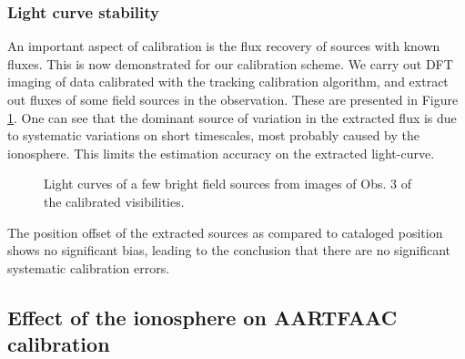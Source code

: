 \documentclass{aa}
\begin{document}
\subsubsection{Light curve stability}

An important  aspect of calibration is  the flux recovery of  sources with known
fluxes. This is  now demonstrated for our calibration scheme.   We carry out DFT
imaging of data calibrated with  the tracking calibration algorithm, and extract
out fluxes  of some field  sources in the  observation.  These are  presented in
Figure  \ref{fig:Light-curves-of}.  One  can  see that  the  dominant source  of
variation in  the extracted flux  is due to  systematic variations on   short
timescales, most probably  caused by the ionosphere.   This limits the estimation
accuracy on the extracted light-curve.

\begin{figure}[tbh]

\caption{\label{fig:Light-curves-of}Light curves of a few bright
field sources from images of Obs. 3 of the calibrated visibilities.}
\end{figure}
The position offset  of the extracted sources as  compared to cataloged position
shows  no  significant  bias,  leading  to  the conclusion  that  there  are  no
significant systematic calibration errors.


\subsection{\label{sub:iono-effect-on-calib}Effect of the ionosphere on AARTFAAC
calibration}
\end{document}
